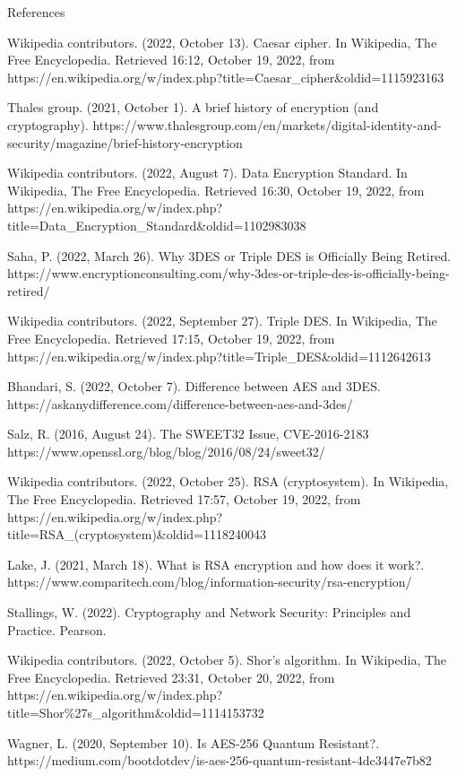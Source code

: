 \documentclass[11pt]{article}
\begin{document}
References

Wikipedia contributors. (2022, October 13). Caesar cipher. In Wikipedia,
The Free Encyclopedia. Retrieved 16:12, October 19, 2022, from
https://en.wikipedia.org/w/index.php?title=Caesar\_cipher\&oldid=1115923163

Thales group. (2021, October 1). A brief history of encryption (and
cryptography).
https://www.thalesgroup.com/en/markets/digital-identity-and-security/magazine/brief-history-encryption

Wikipedia contributors. (2022, August 7). Data Encryption Standard. In
Wikipedia, The Free Encyclopedia. Retrieved 16:30, October 19, 2022,
from
https://en.wikipedia.org/w/index.php?title=Data\_Encryption\_Standard\&oldid=1102983038

Saha, P. (2022, March 26). Why 3DES or Triple DES is Officially Being
Retired.
https://www.encryptionconsulting.com/why-3des-or-triple-des-is-officially-being-retired/

Wikipedia contributors. (2022, September 27). Triple DES. In Wikipedia,
The Free Encyclopedia. Retrieved 17:15, October 19, 2022, from
https://en.wikipedia.org/w/index.php?title=Triple\_DES\&oldid=1112642613

Bhandari, S. (2022, October 7). Difference between AES and 3DES.
https://askanydifference.com/difference-between-aes-and-3des/

Salz, R. (2016, August 24). The SWEET32 Issue, CVE-2016-2183
https://www.openssl.org/blog/blog/2016/08/24/sweet32/

Wikipedia contributors. (2022, October 25). RSA (cryptosystem). In
Wikipedia, The Free Encyclopedia. Retrieved 17:57, October 19, 2022,
from
https://en.wikipedia.org/w/index.php?title=RSA\_(cryptosystem)\&oldid=1118240043

Lake, J. (2021, March 18). What is RSA encryption and how does it work?.
https://www.comparitech.com/blog/information-security/rsa-encryption/

Stallings, W. (2022). Cryptography and Network Security: Principles and
Practice. Pearson.

Wikipedia contributors. (2022, October 5). Shor's algorithm. In
Wikipedia, The Free Encyclopedia. Retrieved 23:31, October 20, 2022,
from
https://en.wikipedia.org/w/index.php?title=Shor\%27s\_algorithm\&oldid=1114153732

Wagner, L. (2020, September 10). Is AES-256 Quantum Resistant?.
https://medium.com/bootdotdev/is-aes-256-quantum-resistant-4dc3447e7b82
\end{document}
